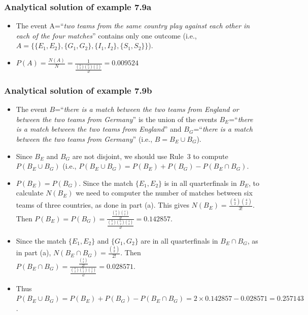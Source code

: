 \begin{frame}
    \frametitle{Analytical solution of example 7.9a}
    \begin{itemize}[<+->]
        \item The event A=``\textit{two teams from the same country play against
            each other in each of the four matches}'' contains only one outcome
            (i.e., $A=\{\{E_1,E_2\},\{G_1,G_2\},\{I_1,I_2\},\{S_1,S_2\}\}$).

        \item
            $P(A)=\frac{N(A)}{N}=\frac{1}{\frac{\binom{8}{2}\binom{6}{2}\binom{4}{2}}{4!}}=0.009524$

    \end{itemize}
\end{frame}

\begin{frame}
    \frametitle{Analytical solution of example 7.9b}
    \begin{itemize}[<+->]
        \scriptsize
        \item The event $B$=``\textit{there is a match between the two teams from
            England or between the two teams from Germany}'' is the union of
            the events $B_E$=``\textit{there is a match between the two teams
            from England}'' and $B_G$=``\textit{there is a match between the
            two teams from Germany}'' (i.e., $B=B_E\cup B_G$).

        \item Since $B_E$ and $B_G$ are not disjoint, we should use Rule~3 to
            compute $P(B_E\cup B_G)$ (i.e., $P(B_E\cup B_G)=P(B_E)+P(B_G)-P(B_E\cap B_G)$.

        \item $P(B_E)=P(B_G)$. Since the match $\{E_1,E_2\}$ is in all
            quarterfinals in $B_E$, to calculate $N(B_E)$ we need to computer
            the number of matches between six teams of three countries, as done
            in part (a). This gives
            $N(B_E)=\frac{\binom{6}{2}\binom{4}{2}}{3!}$. Then
            $P(B_E)=P(B_G)=\frac{\frac{\binom{6}{2}\binom{4}{2}}{3!}}{\frac{\binom{8}{2}\binom{6}{2}\binom{4}{2}}{4!}}=0.142857$.

        \item Since the match $\{E_1,E_2\}$ and $\{G_1,G_2\}$ are in all
            quarterfinals in $B_E\cap B_G$, as in part (a),
            $N(B_E\cap B_G)=\frac{\binom{4}{2}}{2!}$. Then $P(B_E\cap
            B_G)=\frac{\frac{\binom{4}{2}}{2!}}{\frac{\binom{8}{2}\binom{6}{2}\binom{4}{2}}{4!}}=0.028571$.

        \item Thus $P(B_E\cup B_G)=P(B_E)+P(B_G)-P(B_E\cap B_G)=2\times 0.142857-0.028571=0.257143$.
        \normalsize

    \end{itemize}
\end{frame}

